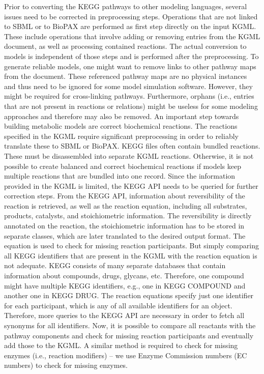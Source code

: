 \documentclass[10pt]{bmc_article}
\newenvironment{bmcformat}{\baselineskip20pt\sloppy\setboolean{publ}{false}}{\baselineskip20pt\sloppy}
\begin{document}
\begin{bmcformat}
Prior to converting the KEGG pathways to other modeling languages, several issues need to be corrected in preprocessing steps.
%
Operations that are not linked to SBML or to BioPAX are performed as first step directly on the input KGML. These include operations that involve adding or removing entries from the KGML document, as well as processing contained reactions. The actual conversion to models is independent of those steps and is performed after the preprocessing.
To generate reliable models, one might want to remove links to other pathway maps from the document. These referenced pathway maps are no physical instances and thus need to be ignored for some model simulation software. However, they might be required for cross-linking pathways. Furthermore, orphans (i.e., entries that are not present in reactions or relations) might be useless for some modeling approaches and therefore may also be removed.
%
An important step towards building metabolic models are correct biochemical reactions. The reactions specified in the KGML require significant preprocessing in order to reliably translate these to SBML or BioPAX.
%
%
KEGG files often contain bundled reactions. These must be disassembled into separate KGML reactions. Otherwise, it is not possible to create balanced and correct biochemical reactions if models keep multiple reactions that are bundled into one record.
Since the information provided in the KGML is limited, the KEGG API needs to be queried for further correction steps. From the KEGG API, information about reversibility of the reaction is retrieved, as well as the reaction equation, including all substrates, products, catalysts, and stoichiometric information. The reversibility is directly annotated on the reaction, the stoichiometric information has to be stored in separate classes, which are later translated to the desired output format. The equation is used to check for missing reaction participants. But simply comparing all KEGG identifiers that are present in the KGML with the reaction equation is not adequate. KEGG consists of many separate databases that contain information about compounds, drugs, glycans, etc. Therefore, one compound might have multiple KEGG identifiers, e.g., one in KEGG COMPOUND and another one in KEGG DRUG. The reaction equations specify just one identifier for each participant, which is any of all available identifiers for an object. Therefore, more queries to the KEGG API are necessary in order to fetch all synonyms for all identifiers. Now, it is possible to compare all reactants with the pathway components and check for missing reaction participants and eventually add those to the KGML. A similar method is required to check for missing enzymes (i.e., reaction modifiers) -- we use Enzyme Commission numbers (EC numbers) to check for missing enzymes.


\end{bmcformat}
\end{document}

